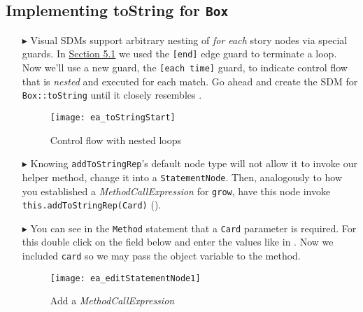 \newpage
\hypertarget{stringRep vis}{}
\subsection{Implementing toString for \texttt{Box}}
\genHeader

\begin{itemize}

\item[$\blacktriangleright$] Visual SDMs support arbitrary nesting of \emph{for each} story nodes via special guards. In \hyperlink{emptyPartition vis}{Section
5.1} we used the \texttt{[end]} edge guard to terminate a loop. Now we'll use a new guard, the \texttt{[each time]} guard, to indicate
control flow that is \emph{nested} and executed for each match. Go ahead and create the SDM for \texttt{Box::toString} until it closely resembles
.

\begin{figure}[htbp]
\begin{center}
  \texttt{[image: ea\_toStringStart]}
  \caption{Control flow with nested loops} 
  \label{ea:sdm_tostring_1}
\end{center}
\end{figure}

\clearpage

\item[$\blacktriangleright$] Knowing \texttt{addToStringRep}'s default node type will not allow it to invoke our helper method, change it
into a \texttt{StatementNode}. Then, analogously to how you established a \emph{MethodCallExpression} for \texttt{grow}, have this node invoke
\texttt{this.addToStringRep(Card)} (). 

\vspace{0.5cm}

\item[$\blacktriangleright$] You can see in the \texttt{Method} statement that a \texttt{Card} parameter is required. For this double click on the field below and enter the values like in . Now we included \texttt{card} so we may pass the object variable to the method.

\vspace{0.5cm}

\begin{figure}[htbp]
\begin{center}
  \texttt{[image: ea\_editStatementNode1]}
  \caption{Add a \emph{MethodCallExpression}}
  \label{ea:editStatement1}
\end{center}
\end{figure}


\end{itemize}
